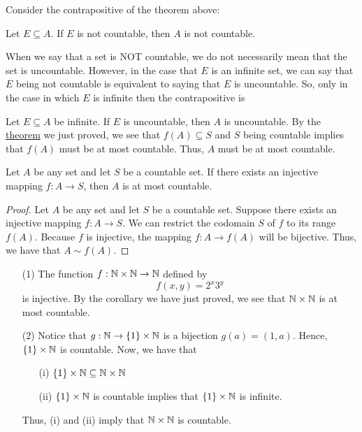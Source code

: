 \documentclass[a4paper]{report}
\begin{document}
\begin{remark}
   Consider the contrapositive of the theorem above:  
   \begin{center}
       Let \( E  \subseteq  A  \). If \( E  \) is not countable, then \( A  \) is not countable. 
   \end{center}
   When we say that a set is NOT countable, we do not necessarily mean that the set is uncountable. However, in the case that \( E  \) is an infinite set, we can say that \( E  \) being not countable is equivalent to saying that \( E  \) is uncountable. So, only in the case in which \( E  \) is infinite then the contrapositive is 
   \begin{center}
       Let \( E \subseteq A   \) be infinite. If \( E  \) is uncountable, then \( A  \) is uncountable. By the {\hyperref[Subsets of countable sets is countable]{theorem}} we just proved, we see that \( f(A) \subseteq S   \) and \( S  \) being countable implies that \( f(A) \) must be at most countable. Thus, \( A  \) must be at most countable.
   \end{center}
   
\end{remark}

\begin{corollary}[ ]\label{Injective mapping implies at most countability}
   Let \( A  \) be any set and let \( S  \) be a countable set. If there exists an injective mapping \( f: A \to S  \), then \( A  \) is at most countable. 
\end{corollary}
\begin{proof}
Let \( A  \) be any set and let \( S  \) be a countable set. Suppose there exists an injective mapping \( f: A \to S  \). We can restrict the codomain \( S  \) of \( f  \) to its range \( f(A) \). Because \( f  \) is injective, the mapping \( f: A \to f(A) \) will be bijective. Thus, we have that \( A \sim f(A) \).
\end{proof}

\begin{eg}
   \begin{enumerate}
       \item[(1)] The function \( f: \mathbb{N} \times \mathbb{N} \to \mathbb{N}  \) defined by
           \[  f(x,y) = 2^{x} 3^{y} \]
           is injective. By the corollary we have just proved, we see that \( \mathbb{N} \times \mathbb{N}  \) is at most countable. 
        \item[(2)] Notice that \( g: \mathbb{N} \to \{ 1 \}  \times \mathbb{N}  \) is a bijection \( g(a) = (1,a) \). Hence, \( \{ 1 \}  \times \mathbb{N}  \) is countable. Now, we have that  
            \begin{enumerate}
                \item[(i)] \( \{ 1 \}  \times \mathbb{N} \subseteq  \mathbb{N} \times \mathbb{N}   \)  
                \item[(ii)] \( \{ 1 \} \times \mathbb{N}  \) is countable implies that \( \{ 1 \}  \times \mathbb{N}  \) is infinite.
            \end{enumerate}
            Thus, (i) and (ii) imply that \( \mathbb{N} \times \mathbb{N}  \) is countable.
   \end{enumerate} 
\end{eg}
\end{document}
